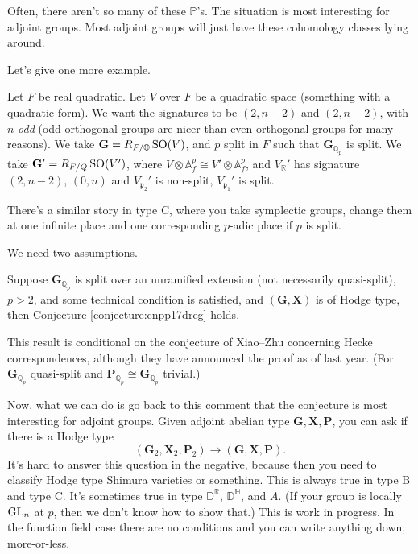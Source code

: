 \documentclass[reqno]{amsart} 
\begin{document}
\begin{remark}
  Often, there aren't so many of these $\mathbb{P}$'s.  The situation is most interesting for adjoint groups.  Most adjoint groups will just have these cohomology classes lying around.  
\end{remark}

Let's give one more example.

\begin{example}[New]
  Let $F$ be real quadratic.  Let $V$ over $F$ be a quadratic space (something with a quadratic form).  We want the signatures to be $(2, n - 2)$ and $(2, n - 2)$, with $n$ \emph{odd} (odd orthogonal groups are nicer than even orthogonal groups for many reasons).  We take $\mathbf{G} = R_{F / \mathbb{Q}} \operatorname{SO}(V)$, and $p$ split in $F$ such that $\mathbf{G}_{\mathbb{Q}_p}$ is split.  We take $\mathbf{G} ' = R_{F/ Q} \operatorname{SO}(V')$, where $V \otimes \mathbb{A}_f^p \cong V' \otimes \mathbb{A}_f^p$, and $V_{\mathbb{R}}'$ has signature $(2, n - 2)$, $(0, n)$ and $V_{\mathfrak{p}_2}'$ is non-split, $V_{\mathfrak{p}_1}'$ is split.

  There's a similar story in type C, where you take symplectic groups, change them at one infinite place and one corresponding $p$-adic place if $p$ is split.
\end{example}

We need two assumptions.
\begin{theorem}[vH--Sempliner]
  Suppose $\mathbf{G}_{\mathbb{Q}_p}$ is split over an unramified extension (not necessarily quasi-split), $p > 2$, and some technical condition is satisfied, and $(\mathbf{G}, \mathbf{X})$ is of Hodge type, then Conjecture \ref{conjecture:cnpp17dreg} holds.

  This result is conditional on the conjecture of Xiao--Zhu concerning Hecke correspondences, although they have announced the proof as of last year.  (For $\mathbf{G}_{\mathbb{Q}_p}$ quasi-split and $\mathbf{P}_{\mathbb{Q}_p} \cong \mathbf{G}_{\mathbb{Q}_p}$ trivial.)
\end{theorem}

Now, what we can do is go back to this comment that the conjecture is most interesting for adjoint groups.  Given adjoint abelian type $\mathbf{G}, \mathbf{X}, \mathbf{P}$, you can ask if there is a Hodge type
\begin{equation*}
  (\mathbf{G}_2, \mathbf{X}_2, \mathbf{P}_2) \rightarrow(\mathbf{G} , \mathbf{X} , \mathbf{P}).
\end{equation*}
It's hard to answer this question in the negative, because then you need to classify Hodge type Shimura varieties or something.  This is always true in type B and type C.  It's sometimes true in type $\mathbb{D}^{\mathbb{R}}$, $\mathbb{D}^{\mathbb{H}}$, and $A$.  (If your group is locally $\operatorname{GL}_n$ at $p$, then we don't know how to show that.)  This is work in progress.  In the function field case there are no conditions and you can write anything down, more-or-less.
\end{document}
